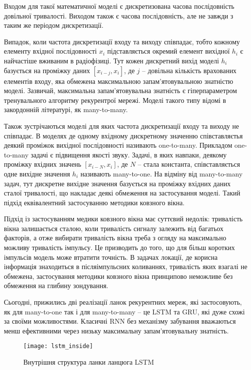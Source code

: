 Входом для такої математичної моделі є дискретизована часова послідовність 
довільної тривалості. Виходом також є часова послідовність, але не завжди з 
таким же періодом дискретизації. 

Випадок, коли частота дискретизації входу та виходу співпадає, тобто кожному 
елементу вхідної послідовності $ x_i $ підставляється окремий елемент 
вихідної $ h_i $ є найчастіше вживаним в радіофізиці. Тут кожен дискретний 
вихід моделі $ h_i $ базується на проміжку даних 
$ \left[ x_{i-j} , x_i \right] $, де $ j $ -- довільна 
кількість врахованих елементів входу, яка обмежена максимальною 
запам'ятовувальною знатністю моделі. Зазвичай, максимальна 
запам'ятовувальна знатність є гіперпараметром тренувального алгоритму 
рекурентрої мережі. Моделі такого типу відомі в закордонній літературі, як 
many-to-many.

Також зустрічаються моделі для яких частота дискретизації входу та виходу 
не співпадає. В моделях де одному вхідному дискретному значенню 
співставляєтья деякий проміжок вихідної послідовності називають one-to-many.
Прикладом one-to-many задачі є підвищення якості звуку. Задачі, в яких 
навпаки, деякому проміжку вхідних значень $ \left[ x_{i-N} , x_i \right] $, 
де $ N $ -- стала константа, співставляється одне вихідне значення $ h_i $
називають many-to-one. На відміну від many-to-many задач, тут 
дискретне вихідне значення базується на проміжку вхідних даних сталої 
тривалості, що накладає деякі обмеження на застосування моделі. Такий 
підхід еквівалентний застосуванню методики ковзного вікна.

Підхід із застосуванням медики ковзного вікна має суттєвий недолік: 
тривалість вікна залишається сталою, коли тривалість сигналу залежить від 
багатьох факторів, а отже вибирати тривалість вікна треба з огляду на 
максимально можливу тривалість імпульсу. Це призводить до того, що для 
більш коротких імпульсів модель може втратити точність. В задачах локації, 
де корисна інформація знаходиться в післяімпульсних коливаннях, тривалість 
яких взагалі не обмежена, застосування методики ковзного вікна принципово 
неможливе без обмеження на глибину зондування.

Сьогодні, прижились дві реалізації ланок рекурентних мереж, які застосовують,
як для many-to-one так і для many-to-many -- це LSTM та GRU, які дуже схожі 
за своїми можливостями. Класичні RNN без механізму забування вважаються менш 
ефективними через низьку максимальну запам'ятовувальну знатність.

\begin{figure}[htbp] \begin{center}
\texttt{[image: lstm\_inside]}
\caption{Внутрішня структура ланки ланцюга LSTM}
\label{fig:lstm_inside}
\end{center} \end{figure}

